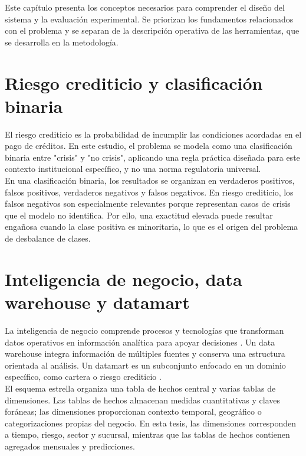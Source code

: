Este capítulo presenta los conceptos necesarios para comprender el diseño del sistema y la evaluación experimental. Se priorizan los fundamentos relacionados con el problema y se separan de la descripción operativa de las herramientas, que se desarrolla en la metodología.

\section{Riesgo crediticio y clasificación binaria}

El riesgo crediticio es la probabilidad de incumplir las condiciones acordadas en el pago de créditos. En este estudio, el problema se modela como una clasificación binaria entre "crisis" y "no crisis", aplicando una regla práctica diseñada para este contexto institucional específico, y no una norma regulatoria universal.\\

En una clasificación binaria, los resultados se organizan en verdaderos positivos, falsos positivos, verdaderos negativos y falsos negativos. En riesgo crediticio, los falsos negativos son especialmente relevantes porque representan casos de crisis que el modelo no identifica. Por ello, una exactitud elevada puede resultar engañosa cuando la clase positiva es minoritaria, lo que es el origen del problema de desbalance de clases.

\section{Inteligencia de negocio, \newline data warehouse y datamart}

La inteligencia de negocio comprende procesos y tecnologías que transforman datos operativos en información analítica para apoyar decisiones \cite{laursen2017business}. Un data warehouse integra información de múltiples fuentes y conserva una estructura orientada al análisis. Un datamart es un subconjunto enfocado en un dominio específico, como cartera o riesgo crediticio \cite{kimball2013datawarehouse}.\\

El esquema estrella organiza una tabla de hechos central y varias tablas de dimensiones. Las tablas de hechos almacenan medidas cuantitativas y claves foráneas; las dimensiones proporcionan contexto temporal, geográfico o categorizaciones propias del negocio. En esta tesis, las dimensiones corresponden a tiempo, riesgo, sector y sucursal, mientras que las tablas de hechos contienen agregados mensuales y predicciones.

